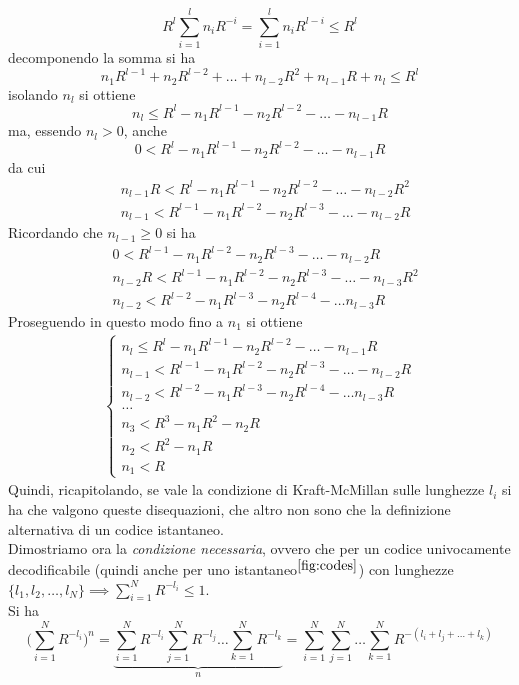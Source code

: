 \begin{tcolorbox}
\begin{equation*}
    R^l \sum_{i=1}^{l} n_i R^{-i} = \sum_{i=1}^{l} n_i R^{l - i} \leq R^l
\end{equation*}
decomponendo la somma si ha
\begin{equation*}
    n_1 R^{l-1} + n_2 R^{l-2} + \dots +n_{l-2}R^2 + n_{l-1}R + n_l \leq R^l
\end{equation*}
isolando $n_l$ si ottiene
\begin{equation*}
    n_l \leq R^l - n_1 R^{l - 1} - n_2 R^{l - 2} - \dots - n_{l-1} R 
\end{equation*}
ma, essendo $n_l > 0$, anche 
\begin{equation*}
    0 < R^l - n_1 R^{l - 1} - n_2 R^{l - 2} - \dots - n_{l-1} R 
\end{equation*}
da cui
\begin{align*}
    &n_{l-1} R < R^l - n_1 R^{l - 1} - n_2 R^{l - 2} - \dots - n_{l-2}R^2 \\
    &n_{l-1} < R^{l-1} - n_1 R^{l-2} - n_2 R^{l -3} - \dots - n_{l-2}R
\end{align*}
Ricordando che $n_{l-1} \geq 0$ si ha
\begin{align*}
    &0 < R^{l-1} - n_1 R^{l-2} - n_2 R^{l-3} - \dots - n_{l-2}R \\
    &n_{l-2}R < R^{l-1} - n_1 R^{l-2} - n_2 R^{l-3} - \dots - n_{l-3}R^2 \\
    &n_{l-2} < R^{l-2} - n_1 R^{l-3} - n_2 R^{l-4} - \dots n_{l-3}R
\end{align*}
Proseguendo in questo modo fino a $n_1$ si ottiene
\begin{align*}
\begin{cases}
n_l \leq R^l - n_1 R^{l - 1} - n_2 R^{l - 2} - \dots - n_{l-1} R \\
n_{l-1} < R^{l-1} - n_1 R^{l-2} - n_2 R^{l -3} - \dots - n_{l-2}R \\
n_{l-2} < R^{l-2} - n_1 R^{l-3} - n_2 R^{l-4} - \dots n_{l-3}R \\
\dots \\
n_3 < R^3 - n_1 R^2 - n_2 R \\
n_2 < R^2 - n_1 R \\
n_1 < R
\end{cases}
\end{align*}
Quindi, ricapitolando, se vale la condizione di Kraft-McMillan sulle lunghezze $l_i$ si ha che valgono queste disequazioni, che altro non sono che la definizione alternativa di un codice istantaneo. \\
Dimostriamo ora la \textit{condizione necessaria}, ovvero che per un codice univocamente decodificabile (quindi anche per uno istantaneo$^{\ref{fig:codes}}$) con lunghezze $\{l_1, l_2, \dots, l_N\} \implies \sum_{i=1}^N R^{-l_i} \leq 1$. \\
Si ha
\begin{equation*}
    \Big ( \sum_{i=1}^N R^{-l_i} \Big )^n = \underbrace{\sum_{i=1}^N R^{-l_i} \sum_{j=1}^N R^{-l_j} \dots \sum_{k=1}^N R^{-l_k}}_n = \sum_{i=1}^N \sum_{j=1}^N \dots \sum_{k=1}^N R^{-(l_i + l_j + \dots + l_k)}
\end{equation*}
\end{tcolorbox}
